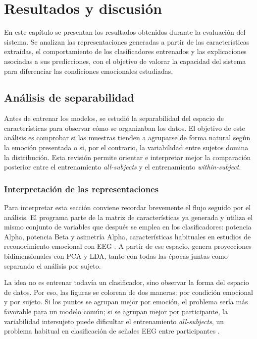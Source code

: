 \chapter{Resultados y discusión}

En este capítulo se presentan los resultados obtenidos durante la evaluación del sistema. Se analizan las representaciones generadas a partir de las características extraídas, el comportamiento de los clasificadores entrenados y las explicaciones asociadas a sus predicciones, con el objetivo de valorar la capacidad del sistema para diferenciar las condiciones emocionales estudiadas.

\section{Análisis de separabilidad}

Antes de entrenar los modelos, se estudió la separabilidad del espacio de características para observar cómo se organizaban los datos. El objetivo de este análisis es comprobar si las muestras tienden a agruparse de forma natural según la emoción presentada o si, por el contrario, la variabilidad entre sujetos domina la distribución. Esta revisión permite orientar e interpretar mejor la comparación posterior entre el entrenamiento \textit{all-subjects} y el entrenamiento \textit{within-subject}.

\subsection{Interpretación de las representaciones}

Para interpretar esta sección conviene recordar brevemente el flujo seguido por el análisis. El programa parte de la matriz de características ya generada y utiliza el mismo conjunto de variables que después se emplea en los clasificadores: potencia Alpha, potencia Beta y asimetría Alpha, características habituales en estudios de reconocimiento emocional con \ac{EEG} \cite{alarcao2019eeg,smith2017frontal}. A partir de ese espacio, genera proyecciones bidimensionales con \ac{PCA} y \ac{LDA}, tanto con todas las épocas juntas como separando el análisis por sujeto.

La idea no es entrenar todavía un clasificador, sino observar la forma del espacio de datos. Por eso, las figuras se colorean de dos maneras: por condición emocional y por sujeto. Si los puntos se agrupan mejor por emoción, el problema sería más favorable para un modelo común; si se agrupan mejor por participante, la variabilidad intersujeto puede dificultar el entrenamiento \textit{all-subjects}, un problema habitual en clasificación de señales \ac{EEG} entre participantes \cite{lotte2007classification,rajpoot2022subject}.

